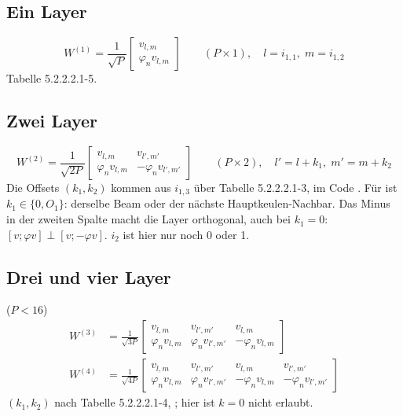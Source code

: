 \subsection{Ein Layer}
\begin{equation}
  W^{(1)} = \frac{1}{\sqrt{P}}\begin{bmatrix} v_{l,m} \\ \varphi_n v_{l,m} \end{bmatrix}\qquad (P\times1),
  \quad l = i_{1,1},\; m = i_{1,2}
\end{equation}
Tabelle 5.2.2.2.1-5.

\subsection{Zwei Layer}
\begin{equation}
  W^{(2)} = \frac{1}{\sqrt{2P}}\begin{bmatrix} v_{l,m} & v_{l',m'} \\ \varphi_n v_{l,m} & -\varphi_n v_{l',m'} \end{bmatrix}
  \qquad (P\times2),\quad l' = l + k_1,\; m' = m + k_2
\end{equation}
Die Offsets $(k_1,k_2)$ kommen aus $i_{1,3}$ über Tabelle 5.2.2.2.1-3, im Code .
Für  ist $k_1\in\{0, O_1\}$: derselbe Beam oder der nächste Hauptkeulen-Nachbar. Das Minus in der
zweiten Spalte macht die Layer orthogonal, auch bei $k_1=0$: $[v;\varphi v]\perp[v;-\varphi v]$. $i_2$ ist hier
nur noch 0 oder 1.

\subsection{Drei und vier Layer} ($P<16$)
\begin{align}
  W^{(3)} &= \frac{1}{\sqrt{3P}}\begin{bmatrix} v_{l,m} & v_{l',m'} & v_{l,m} \\ \varphi_n v_{l,m} & \varphi_n v_{l',m'} & -\varphi_n v_{l,m} \end{bmatrix} \\
  W^{(4)} &= \frac{1}{\sqrt{4P}}\begin{bmatrix} v_{l,m} & v_{l',m'} & v_{l,m} & v_{l',m'} \\ \varphi_n v_{l,m} & \varphi_n v_{l',m'} & -\varphi_n v_{l,m} & -\varphi_n v_{l',m'} \end{bmatrix}
\end{align}
$(k_1,k_2)$ nach Tabelle 5.2.2.2.1-4, ; hier ist $k=0$ nicht erlaubt.

